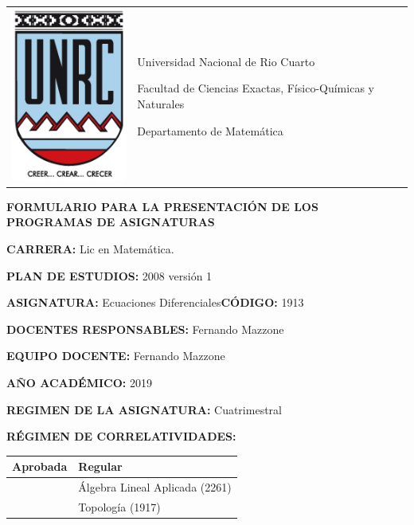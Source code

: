 \documentclass[12pt]{article}
\begin{document}
\pagestyle{plain}


\setlength{\unitlength}{1cm}
%
%

\noindent\begin{tabular}{m{} m{}}
\includegraphics[scale=.25]{escudounrc.jpg} &
{
Universidad Nacional de Rio Cuarto\par
Facultad de Ciencias Exactas, Físico-Químicas y Naturales\par
Departamento de Matemática
}
\\
\end{tabular}

\setlength{\parindent}{0pt} %

\begin{center}
 \textbf{FORMULARIO PARA LA PRESENTACIÓN DE LOS PROGRAMAS DE ASIGNATURAS}
\end{center}





 \textbf{CARRERA:}  Lic en Matemática.

 \textbf{PLAN DE ESTUDIOS:} 2008 versión 1

 \textbf{ASIGNATURA:}  Ecuaciones Diferenciales\quad\textbf{CÓDIGO:} 1913

\textbf{DOCENTES RESPONSABLES:} Fernando Mazzone

\textbf{EQUIPO DOCENTE:} Fernando Mazzone

\textbf{AÑO ACADÉMICO:} 2019

\textbf{REGIMEN DE LA ASIGNATURA:} Cuatrimestral

\textbf{RÉGIMEN DE CORRELATIVIDADES:}

\begin{table}[h]
\begin{tabular}{|l|l|}\hline
 Aprobada & Regular\\\hline
 &
 Álgebra Lineal Aplicada (2261)\\\hline
 &
Topología (1917)\\ \hline
\end{tabular}
 \end{table}
\end{document}
